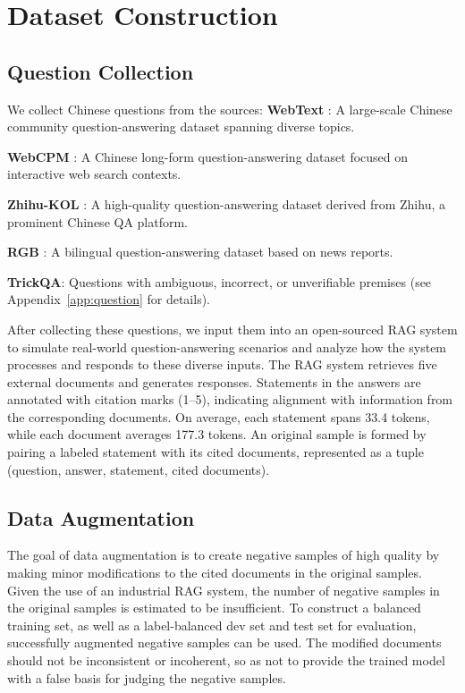 \section{Dataset Construction}




\subsection{Question Collection}
We collect Chinese questions from the sources:
\noindent \textbf{WebText} \cite{bright_xu_2019_3402023}: A large-scale Chinese community question-answering dataset spanning diverse topics.

\noindent \textbf{WebCPM} \cite{DBLP:conf/acl/QinCJYLZLHDWXQL23}: A Chinese long-form question-answering dataset focused on interactive web search contexts.

\noindent \textbf{Zhihu-KOL} \cite{zhihu-kol}: A high-quality question-answering dataset derived from Zhihu, a prominent Chinese QA platform.

\noindent \textbf{RGB} \cite{DBLP:conf/aaai/0011LH024}: A bilingual question-answering dataset based on news reports.

\noindent \textbf{TrickQA}: Questions with ambiguous, incorrect, or unverifiable premises (see Appendix~\ref{app:question} for details).

After collecting these questions, we input them into an open-sourced RAG system to simulate real-world question-answering scenarios and analyze how the system processes and responds to these diverse inputs. The RAG system retrieves five external documents and generates responses. Statements in the answers are annotated with citation marks (1–5), indicating alignment with information from the corresponding documents. On average, each statement spans 33.4 tokens, while each document averages 177.3 tokens. An original sample is formed by pairing a labeled statement with its cited documents, represented as a tuple (question, answer, statement, cited documents).


\subsection{Data Augmentation}

The goal of data augmentation is to create negative samples of high quality by making minor modifications to the cited documents in the original samples. Given the use of an industrial RAG system, the number of negative samples in the original samples is estimated to be insufficient. To construct a balanced training set, as well as a label-balanced dev set and test set for evaluation, successfully augmented negative samples can be used. The modified documents should not be inconsistent or incoherent, so as not to provide the trained model with a false basis for judging the negative samples.

